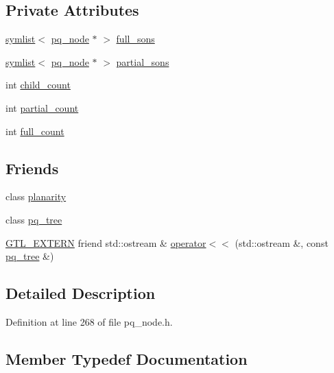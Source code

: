 \subsection*{Private Attributes}
\begin{DoxyCompactItemize}
\item 
\mbox{\hyperlink{classsymlist}{symlist}}$<$ \mbox{\hyperlink{classpq__node}{pq\+\_\+node}} $\ast$ $>$ \mbox{\hyperlink{classp__node_a09658fb7a7212e51b877444e4cee4378}{full\+\_\+sons}}
\item 
\mbox{\hyperlink{classsymlist}{symlist}}$<$ \mbox{\hyperlink{classpq__node}{pq\+\_\+node}} $\ast$ $>$ \mbox{\hyperlink{classp__node_a8acc45be68133af1b6a2823875729798}{partial\+\_\+sons}}
\item 
int \mbox{\hyperlink{classp__node_a74d5be4f6767bda5b5803dc2f0987b74}{child\+\_\+count}}
\item 
int \mbox{\hyperlink{classp__node_a9ac93f9a0f474dcc74312e820fde73b6}{partial\+\_\+count}}
\item 
int \mbox{\hyperlink{classp__node_a67a7570ace6b26d3bcbff7cf71c85cb0}{full\+\_\+count}}
\end{DoxyCompactItemize}
\subsection*{Friends}
\begin{DoxyCompactItemize}
\item 
class \mbox{\hyperlink{classp__node_ab6a02224dbc06343d95919289aec77c8}{planarity}}
\item 
class \mbox{\hyperlink{classp__node_a0a5be4bb438c891059fae98f607f2a9c}{pq\+\_\+tree}}
\item 
\mbox{\hyperlink{_g_t_l_8h_a014cd1e9b3e67a78ae433eda95c8fd25}{G\+T\+L\+\_\+\+E\+X\+T\+E\+RN}} friend std\+::ostream \& \mbox{\hyperlink{classp__node_a2db830bf75339bd39c819c231c03769b}{operator$<$$<$}} (std\+::ostream \&, const \mbox{\hyperlink{classpq__tree}{pq\+\_\+tree}} \&)
\end{DoxyCompactItemize}


\subsection{Detailed Description}


Definition at line 268 of file pq\+\_\+node.\+h.



\subsection{Member Typedef Documentation}
\mbox{\label{classpq__node_a34898c9eb1527787c07e8ebefd6bfba5}} 
